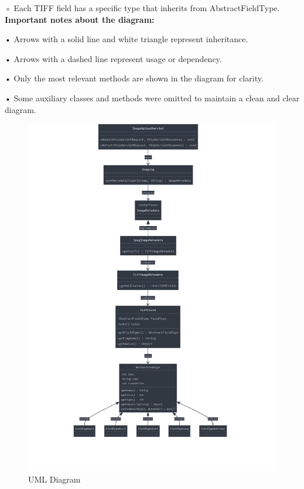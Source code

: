\documentclass[sigconf]{acmart}
\begin{document}
        ◦ Each TIFF field has a specific type that inherits from AbstractFieldType.
\hfill\\        
\textbf{Important notes about the diagram:}

    • Arrows with a solid line and white triangle represent inheritance.
    
    • Arrows with a dashed line represent usage or dependency.
    
    • Only the most relevant methods are shown in the diagram for clarity.
    
    • Some auxiliary classes and methods were omitted to maintain a clean and clear diagram.

\begin{figure}[h!]
    \centering
    \includegraphics[width=1\linewidth]{class diagram UML.png}
    \caption{UML Diagram}
    \label{fig:enter-label}
\end{figure}
\end{document}
